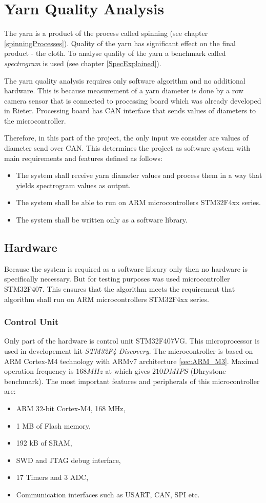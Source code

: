 \documentclass[twoside]{ctuthesis}
\theoremstyle{plain}
\theoremstyle{definition}
\theoremstyle{note}
\begin{document}
\section{Yarn Quality Analysis}
The yarn is a product of the process called spinning (see chapter \ref{spinningProcesses}). Quality of the yarn has significant effect on the final product - the cloth. To analyse quality of the yarn a benchmark called \textit{spectrogram} is used (see chapter \ref{SpecExplained}).

The yarn quality analysis requires only software algorithm and no additional hardware. This is because measurement of a yarn diameter is done by a row camera sensor that is connected to processing board which was already developed in Rieter. Processing board has CAN interface that sends values of diameters to the microcontroller. 

Therefore, in this part of the project, the only input we consider are values of diameter send over CAN. This determines the project as software system with main requirements and features defined as follows:
\begin{itemize}
	\setlength{\itemsep}{5pt}
	\item The system shall receive yarn diameter values and process them in a way that yields spectrogram values as output.
	\item The system shall be able to run on ARM microcontrollers STM32F4xx series.
	\item The system shall be written only as a software library.
\end{itemize}

\subsection{Hardware}
Because the system is required as a software library only then no hardware is specifically necessary. But for testing purposes was used microcontroller STM32F407. This ensures that the algorithm meets the requirement that algorithm shall run on ARM microcontrollers STM32F4xx series.
\subsubsection{Control Unit}
\label{sec:microControllerYarn}
Only part of the hardware is control unit STM32F407VG. This microprocessor is used in developement kit \textit{STM32F4 Discovery}.
The microcontroller is based on ARM Cortex-M4 technology with ARMv7 architecture \ref{sec:ARM_M3}. Maximal operation frequency is $168 MHz$ at which gives $210 DMIPS$ (Dhrystone benchmark). The most important features and peripherals of this microcontroller are:
\begin{itemize}
	\setlength{\itemsep}{5pt}
	\item ARM 32-bit Cortex-M4, 168 MHz,
	\item 1 MB of Flash memory,
	\item 192 kB of SRAM,
	\item SWD and JTAG debug interface,
	\item 17 Timers and 3 ADC,
	\item Communication interfaces such as USART, CAN, SPI etc.
\end{itemize}	
\end{document}
